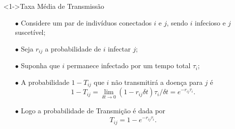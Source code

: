 \documentclass{beamer}
\begin{document}
\begin{frame}

\begin{exampleblock}
    <1->{Taxa Média de Transmissão}

    \begin{itemize}
        \item[$\bullet$] Considere um par de indivíduos conectados $i$ e $j$, sendo $i$ infecioso
            e $j$ suscetível;
        \item[$\bullet$] Seja $r_{ij}$ a probabilidade de $i$ infectar $j$;
        \item[$\bullet$] Suponha que $i$ permanece infectado por um tempo total $\tau_i$;
        \item[$\bullet$] A probabilidade $1 - T_{ij}$ que $i$ não transmitirá a doença para $j$ é
            \[
                1 - T_{ij} = \lim_{\delta t \to 0} (1 - r_{ij} \delta t) \tau_i / \delta t = e^{- r_{ij} \tau_i }.
            \]
        \item[$\bullet$] Logo a probabilidade de Transmição é dada por
            \begin{align}
                T_{ij} = 1 -  e^{- r_{ij} \tau_i }. 
            \end{align}
    \end{itemize}       

\end{exampleblock}

\end{frame}

\end{document}
